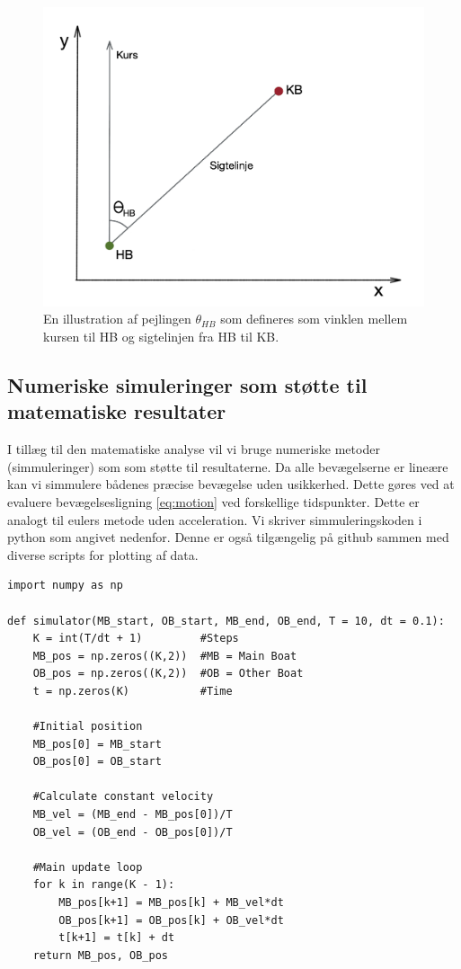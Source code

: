 \documentclass[%
 reprint,
nofootinbib,
aps,
]{revtex4-1}
\begin{document}
\begin{figure}[H]
  \includegraphics[width=\linewidth]{figures/metode_tegning.png}
  \caption{En illustration af pejlingen $\theta_{HB}$ som defineres som vinklen mellem kursen til HB og sigtelinjen fra HB til KB.  }
  \label{fig:metode_tegning}
\end{figure}

\subsection{Numeriske simuleringer som støtte til matematiske resultater}\label{sec:numerical_method}
I tillæg til den matematiske analyse vil vi bruge numeriske metoder (simmuleringer) som som støtte til resultaterne. Da alle bevægelserne er lineære kan vi simmulere bådenes præcise bevægelse uden usikkerhed. Dette gøres ved at evaluere bevægelsesligning \ref{eq:motion} ved forskellige tidspunkter. Dette er analogt til eulers metode uden acceleration. Vi skriver simmuleringskoden i python som angivet nedenfor. Denne er også tilgængelig på github \cite{github} sammen med diverse scripts for plotting af data.

\begin{verbatim}
import numpy as np

def simulator(MB_start, OB_start, MB_end, OB_end, T = 10, dt = 0.1):
    K = int(T/dt + 1)         #Steps
    MB_pos = np.zeros((K,2))  #MB = Main Boat
    OB_pos = np.zeros((K,2))  #OB = Other Boat
    t = np.zeros(K)           #Time

    #Initial position
    MB_pos[0] = MB_start
    OB_pos[0] = OB_start

    #Calculate constant velocity
    MB_vel = (MB_end - MB_pos[0])/T
    OB_vel = (OB_end - OB_pos[0])/T

    #Main update loop
    for k in range(K - 1):
        MB_pos[k+1] = MB_pos[k] + MB_vel*dt
        OB_pos[k+1] = OB_pos[k] + OB_vel*dt
        t[k+1] = t[k] + dt
    return MB_pos, OB_pos
\end{verbatim}
\end{document}

